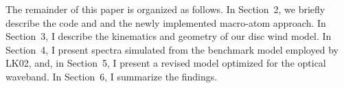 The remainder of this paper is organized as follows. In Section~2, we
briefly describe the code and and the newly implemented macro-atom
approach. In Section~3, I describe the kinematics and geometry of our
disc wind model. In Section~4, I present spectra simulated 
from the benchmark model
employed by LK02, and, in Section~5, I present a revised model
optimized for the optical waveband. In Section~6, I summarize the
findings.


%
%






